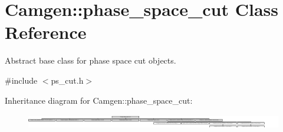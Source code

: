 \hypertarget{a00419}{}\section{Camgen\+:\+:phase\+\_\+space\+\_\+cut Class Reference}
\label{a00419}


Abstract base class for phase space cut objects.  




{\ttfamily \#include $<$ps\+\_\+cut.\+h$>$}

Inheritance diagram for Camgen\+:\+:phase\+\_\+space\+\_\+cut\+:\begin{figure}[H]
\begin{center}
\leavevmode
\includegraphics[height=0.643124cm]{a00419}
\end{center}
\end{figure}
